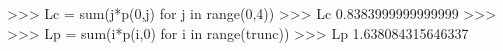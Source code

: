 
>>> Lc = sum(j*p(0,j) for j in range(0,4))
>>> Lc
0.8383999999999999
>>>
>>> Lp = sum(i*p(i,0) for i in range(trunc))
>>> Lp
1.638084315646337

